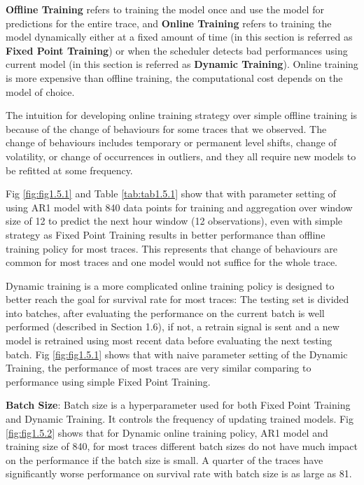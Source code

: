 \documentclass{article}
\begin{document}
\begin{flushleft}
\textbf{Offline Training} refers to training the model once and use the model for predictions for the entire trace, and \textbf{Online Training} refers to training the model dynamically either at a fixed amount of time (in this section is referred as \textbf{Fixed Point Training}) or when the scheduler detects bad performances using current model (in this section is referred as \textbf{Dynamic Training}). Online training is more expensive than offline training, the computational cost depends on the model of choice.
\end{flushleft}

\begin{flushleft}
The intuition for developing online training strategy over simple offline training is because of the change of behaviours for some traces that we observed. The change of behaviours includes temporary or permanent level shifts, change of volatility, or change of occurrences in outliers, and they all require new models to be refitted at some frequency.
\end{flushleft}

\begin{flushleft}
Fig \ref{fig:fig1.5.1} and Table \ref{tab:tab1.5.1} show that with parameter setting of using AR1 model with 840 data points for training and aggregation over window size of 12 to predict the next hour window (12 observations), even with simple strategy as Fixed Point Training results in better performance than offline training policy for most traces. This represents that change of behaviours are common for most traces and one model would not suffice for the whole trace.
\end{flushleft}

\begin{flushleft}
Dynamic training is a more complicated online training policy is designed to better reach the goal for survival rate for most traces: The testing set is divided into batches, after evaluating the performance on the current batch is well performed (described in Section 1.6), if not, a retrain signal is sent and a new model is retrained using most recent data before evaluating the next testing batch. Fig \ref{fig:fig1.5.1} shows that with naive parameter setting of the Dynamic Training, the performance of most traces are very similar comparing to performance using simple Fixed Point Training.
\end{flushleft}

\begin{flushleft}
\textbf{Batch Size}: Batch size is a hyperparameter used for both Fixed Point Training and Dynamic Training. It controls the frequency of updating trained models. Fig \ref{fig:fig1.5.2} shows that for Dynamic online training policy, AR1 model and training size of 840, for most traces different batch sizes do not have much impact on the performance if the batch size is small. A quarter of the traces have significantly worse performance on survival rate with batch size is as large as 81.
\end{flushleft}
\end{document}
